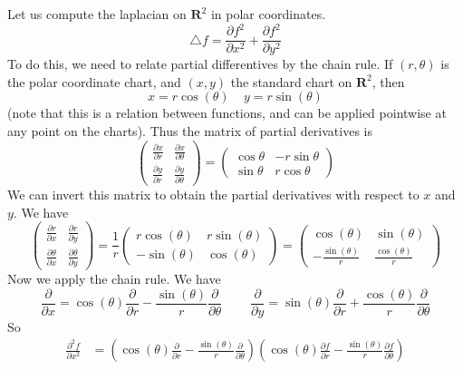 \begin{example}
    Let us compute the laplacian on $\mathbf{R}^2$ in polar coordinates.
    \[ \bigtriangleup f = \frac{\partial f^2}{\partial x^2} + \frac{\partial f^2}{\partial y^2} \]
    To do this, we need to relate partial differentives by the chain rule. If $(r,\theta)$ is the polar coordinate chart, and $(x,y)$ the standard chart on $\mathbf{R}^2$, then
    \[ x = r \cos(\theta)\ \ \ \ \ y = r \sin(\theta) \]
    (note that this is a relation between functions, and can be applied pointwise at any point on the charts). Thus the matrix of partial derivatives is
    \[ \begin{pmatrix} \frac{\partial x}{\partial r} & \frac{\partial x}{\partial \theta} \\ \frac{\partial y}{\partial r} & \frac{\partial y}{\partial \theta} \end{pmatrix} = \begin{pmatrix} \cos \theta & -r \sin \theta \\ \sin \theta & r \cos \theta \end{pmatrix} \]
    We can invert this matrix to obtain the partial derivatives with respect to $x$ and $y$. We have
    \[ \begin{pmatrix} \frac{\partial r}{\partial x} & \frac{\partial r}{\partial y} \\ \frac{\partial \theta}{\partial x} & \frac{\partial \theta}{\partial y} \end{pmatrix} = \frac{1}{r} \begin{pmatrix} r \cos(\theta) & r \sin(\theta) \\ -\sin(\theta) & \cos(\theta) \end{pmatrix} = \begin{pmatrix} \cos(\theta) & \sin(\theta) \\ -\frac{\sin(\theta)}{r} & \frac{\cos(\theta)}{r} \end{pmatrix} \]
    Now we apply the chain rule. We have
    \[ \frac{\partial}{\partial x} = \cos(\theta) \frac{\partial}{\partial r} - \frac{\sin(\theta)}{r} \frac{\partial}{\partial \theta}\ \ \ \ \ \ \ \ \ \ \frac{\partial}{\partial y} = \sin(\theta) \frac{\partial}{\partial r} + \frac{\cos(\theta)}{r} \frac{\partial}{\partial \theta} \]
    So
    \begin{align*}
        \frac{\partial^2 f}{\partial x^2} &= \left( \cos(\theta) \frac{\partial}{\partial r} - \frac{\sin(\theta)}{r} \frac{\partial}{\partial \theta} \right) \left( \cos(\theta) \frac{\partial f}{\partial r} - \frac{\sin(\theta)}{r} \frac{\partial f}{\partial \theta} \right)\\

\end{align*}
\end{example}
